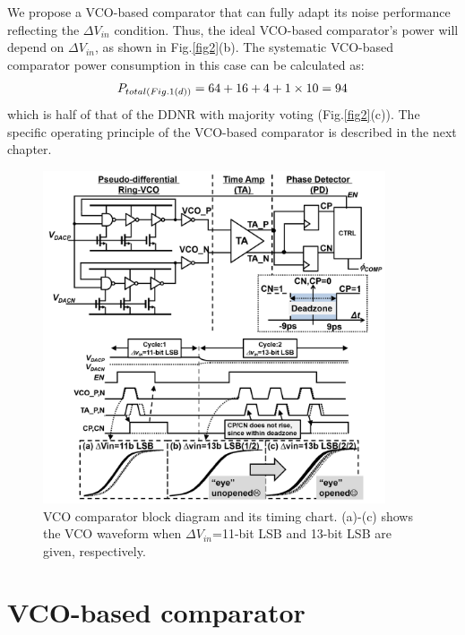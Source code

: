 \documentclass[journal]{IEEEtran}
\begin{document}
We propose a VCO-based comparator that can fully adapt its noise performance reflecting the $\Delta V_{in}$ condition. Thus, the ideal VCO-based comparator's power will depend on $\Delta V_{in}$, as shown in Fig.\ref{fig2}(b). The systematic VCO-based comparator power consumption in this case can be calculated as:
\begin{eqnarray}
    \centering
    P_{total(Fig.1(d))} = 64+16+4+1\times 10=94
    \label{ddnr}
\end{eqnarray}
which is half of that of the DDNR with majority voting (Fig.\ref{fig2}(c)). 
The specific operating principle of the VCO-based comparator is described in the next chapter.


\begin{figure}[!]
\centering
 \includegraphics[width=0.9\textwidth]{figs/fig4.png}
  \caption{VCO comparator block diagram and its timing chart. (a)-(c) shows the VCO waveform when $\Delta V_{in}$=11-bit LSB and 13-bit LSB are given, respectively.}
  \label{schema}
\end{figure}

\section{VCO-based comparator}
\end{document}

